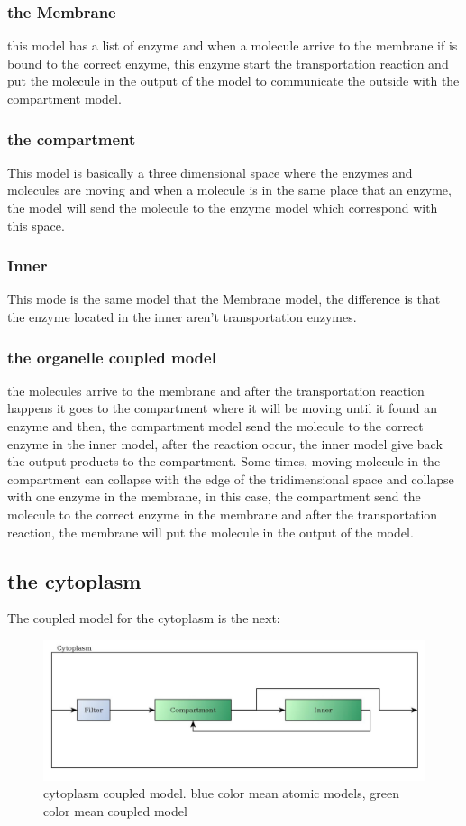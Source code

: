 \documentclass[12pt]{article}
\begin{document}
\subsubsection*{the Membrane}
this model has a list of enzyme and when a molecule arrive to the membrane if is bound to the correct enzyme, this enzyme start the transportation reaction and put the molecule in the output of the model to communicate the outside with the compartment model.

\subsubsection*{the compartment}
This model is basically a three dimensional space where the enzymes and molecules are moving and when a molecule is in the same place that an enzyme, the model will send the molecule to the enzyme model which correspond with this space.

\subsubsection*{Inner}
This mode is the same model that the Membrane model, the difference is that the enzyme located in the inner aren't transportation enzymes.

\subsubsection*{the organelle coupled model}
the molecules arrive to the membrane and after the transportation reaction happens it goes to the compartment where it will be moving until it found an enzyme and then, the compartment model send the molecule to the correct enzyme in the inner model, after the reaction occur, the inner model give back the output products to the compartment. Some times, moving molecule in the compartment can collapse with the edge of the tridimensional space and collapse with one enzyme in the membrane, in this case, the compartment send the molecule to the correct enzyme in the membrane and after the transportation reaction, the membrane will put the molecule in the output of the model.

\subsection*{the cytoplasm}
The coupled model for the cytoplasm is the next:

\begin{figure}[h!]
 \centering
  \includegraphics[width=1\textwidth]{coupled-cytoplasm.jpg}
 \caption{cytoplasm coupled model. blue color mean atomic models, green color mean coupled model}
\end{figure}
\end{document}
